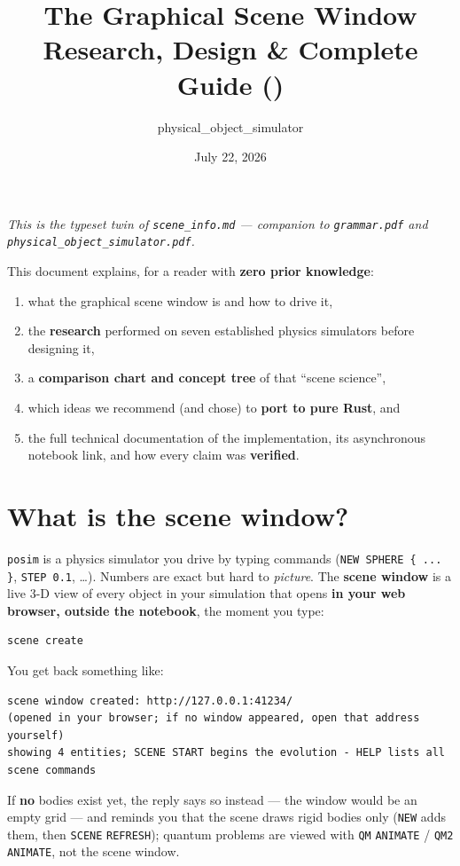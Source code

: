 \documentclass[11pt]{article}
\title{The \code{posim} Graphical Scene Window\\[2pt]
       \large Research, Design \& Complete Guide (\code{scene\_info})}
\author{physical\_object\_simulator}
\date{July 22, 2026}
\newcommand{\kw}[1]{\texttt{\uppercase{#1}}}
\newcommand{\code}[1]{\texttt{#1}}
\begin{document}
\maketitle

\noindent\emph{This is the typeset twin of \code{scene\_info.md} ---
companion to \code{grammar.pdf} and
\code{physical\_object\_simulator.pdf}.}

This document explains, for a reader with \textbf{zero prior knowledge}:
\begin{enumerate}
\item what the graphical scene window is and how to drive it,
\item the \textbf{research} performed on seven established physics
      simulators before designing it,
\item a \textbf{comparison chart and concept tree} of that ``scene
      science'',
\item which ideas we recommend (and chose) to \textbf{port to pure
      Rust}, and
\item the full technical documentation of the implementation, its
      asynchronous notebook link, and how every claim was
      \textbf{verified}.
\end{enumerate}

\tableofcontents

\section{What is the scene window?}

\code{posim} is a physics simulator you drive by typing commands
(\code{NEW SPHERE \{ ... \}}, \code{STEP 0.1}, \ldots). Numbers are
exact but hard to \emph{picture}. The \textbf{scene window} is a live
3-D view of every object in your simulation that opens \textbf{in your
web browser, outside the notebook}, the moment you type:

\begin{lstlisting}
scene create
\end{lstlisting}

You get back something like:

\begin{lstlisting}
scene window created: http://127.0.0.1:41234/
(opened in your browser; if no window appeared, open that address yourself)
showing 4 entities; SCENE START begins the evolution - HELP lists all scene commands
\end{lstlisting}

If \textbf{no} bodies exist yet, the reply says so instead --- the
window would be an empty grid --- and reminds you that the scene draws
rigid bodies only (\kw{new} adds them, then \kw{scene} \kw{refresh});
quantum problems are viewed with \kw{qm} \kw{animate} /
\kw{qm2} \kw{animate}, not the scene window.
\end{document}

